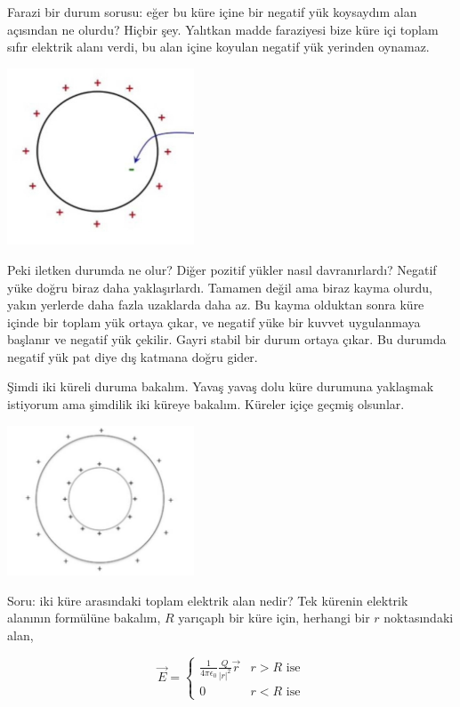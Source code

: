 \documentclass[12pt,fleqn]{article}\usepackage{../../common}
\begin{document}
Farazi bir durum sorusu: eğer bu küre içine bir negatif yük koysaydım alan
açısından ne olurdu?  Hiçbir şey. Yalıtkan madde faraziyesi bize küre içi toplam
sıfır elektrik alanı verdi, bu alan içine koyulan negatif yük yerinden oynamaz.

\includegraphics[width=15em]{07_03.jpg}

Peki iletken durumda ne olur? Diğer pozitif yükler nasıl davranırlardı? Negatif
yüke doğru biraz daha yaklaşırlardı. Tamamen değil ama biraz kayma olurdu, yakın
yerlerde daha fazla uzaklarda daha az. Bu kayma olduktan sonra küre içinde bir
toplam yük ortaya çıkar, ve negatif yüke bir kuvvet uygulanmaya başlanır ve
negatif yük çekilir. Gayri stabil bir durum ortaya çıkar. Bu durumda negatif yük
pat diye dış katmana doğru gider.

Şimdi iki küreli duruma bakalım. Yavaş yavaş dolu küre durumuna yaklaşmak
istiyorum ama şimdilik iki küreye bakalım. Küreler içiçe geçmiş olsunlar.

\includegraphics[width=15em]{07_04.jpg}

Soru: iki küre arasındaki toplam elektrik alan nedir? Tek kürenin elektrik
alanının formülüne bakalım, $R$ yarıçaplı bir küre için, herhangi bir $r$
noktasındaki alan,

$$
\vec{E} = \left\{ \begin{array}{ll}
\frac{1}{4\pi\epsilon_0} \frac{Q}{|r|^2} \vec{r} & r>R \textrm{ ise}\\
0 & r<R \textrm{ ise}
\end{array} \right.
$$
\end{document}
